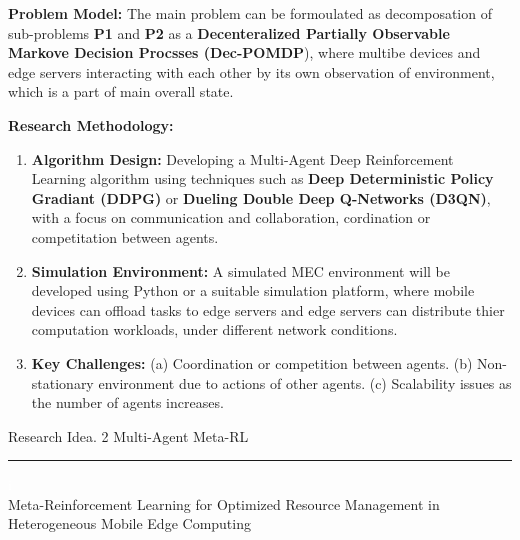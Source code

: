 \documentclass[12pt]{article}
\begin{document}
\noindent\textbf{\large Problem Model: }
\noindent
The main problem can be formoulated as decomposation of sub-problems \textbf{P1} and \textbf{P2} as a \textbf{Decenteralized Partially Observable Markove Decision Procsses (Dec-POMDP}), where multibe devices and edge servers interacting with each other by its own observation of environment, which is a part of main overall state. 

\vspace{3mm}

\noindent\textbf{\large Research Methodology: }
\begin{enumerate} 
	\item \textbf{Algorithm Design:} Developing a Multi-Agent Deep Reinforcement Learning algorithm using techniques such as \textbf{Deep Deterministic Policy Gradiant (DDPG)} or \textbf{Dueling Double Deep Q-Networks (D3QN)}, with a focus on communication and collaboration, cordination or competitation between agents. \vspace{-1mm}
	\item \textbf{Simulation Environment:} A simulated MEC environment will be developed using Python or a suitable simulation platform, where mobile devices can offload tasks to edge servers and edge servers can distribute thier computation workloads, under different network conditions.\vspace{-1mm}
	\item \textbf{Key Challenges:} (a) Coordination or competition between agents. (b) Non-stationary environment due to actions of other agents.  (c) Scalability issues as the number of agents increases.
\end{enumerate}



\newpage




\begin{center} 
	
	
	\vspace{-17mm}
	
	\large Research Idea. 2  \hfill Multi-Agent Meta-RL \vspace{1mm} \hrule
	
	\vspace{-1mm}
	
	
	
	\textcolor{white}{i} \\ \LARGE Meta-Reinforcement Learning for Optimized Resource Management in Heterogeneous Mobile Edge Computing  \vspace{6mm}\\
	
\end{center}
\vspace{-5mm}
\end{document}
